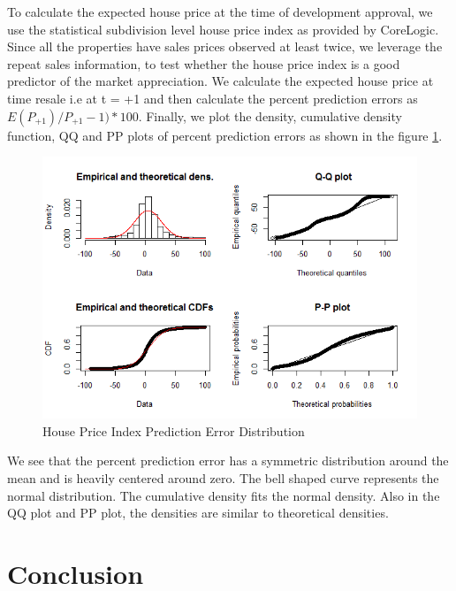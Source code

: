 \documentclass{article}
\begin{document}
To calculate the expected house price at the time of development approval, we use the statistical subdivision level house price index as provided by CoreLogic. Since all the properties have sales prices observed at least twice, we leverage the repeat sales information, to test whether the house price index is a good predictor of the market appreciation. We calculate the expected house price at time resale i.e at t = +1 and then calculate the percent prediction errors as $E(P_{+1})/P_{+1} - 1) * 100$. Finally, we plot the density, cumulative density function, QQ and PP plots of percent prediction errors as shown in the figure \ref{fig:Rplot_ssd_err_10}. 

\begin{figure}[!htb]
    \centering
     \includegraphics[width=\columnwidth]{Figures/Rplot_qqplot.png} \par
 \caption{House Price Index Prediction Error Distribution}
 \label{fig:Rplot_ssd_err_10}
\end{figure}

We see that the percent prediction error has a symmetric distribution around the mean and is heavily centered around zero. The bell shaped curve represents the normal distribution. The cumulative density fits the normal density. Also in the QQ plot and PP plot, the densities are similar to theoretical densities.


\section{Conclusion}
\end{document}

